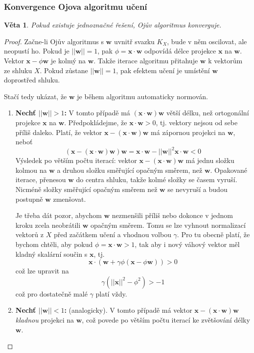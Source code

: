 \documentclass[11pt]{report} %
\renewcommand{\vec}[1]{\mathbf{#1}}
\newtheorem{theorem}{Věta}[section]
\numberwithin{equation}{section}
\begin{document}
\subsubsection{Konvergence Ojova algoritmu učení}
\begin{theorem}
Pokud existuje jednoznačné řešení, Ojův algoritmus konverguje.
\end{theorem}
\begin{proof}
Začne-li Ojův algoritmus s $\vec{w}$ uvnitř svazku $K_X$, bude v něm oscilovat, ale neopustí ho. Pokud je $||\vec{w}|| = 1$, pak $\phi = \vec{x}\cdot\vec{w}$ odpovídá délce projekce $\vec{x}$ na $\vec{w}$. Vektor $\vec{x} - \phi\vec{w}$ je kolmý na $\vec{w}$. Takže iterace algoritmu přitahuje $\vec{w}$ k vektorům ze shluku $X$. Pokud zůstane $||\vec{w}|| = 1$, pak efektem učení je umístění $\vec{w}$ doprostřed shluku.




Stačí tedy ukázat, že $\vec{w}$ je během algoritmu automaticky normován. 
\begin{enumerate}
	\item \textbf{Nechť $||\vec{w}|| > 1$:} V tomto případě má $(\vec{x}\cdot\vec{w})\vec{w}$ větší délku, než ortogonální projekce $\vec{x}$ na $\vec{w}$. Předpokládejme, že $\vec{x}\cdot\vec{w} > 0$, tj. vektory nejsou od sebe příliš daleko. Platí, že vektor $\vec{x} - (\vec{x}\cdot\vec{w})\vec{w}$ má zápornou projekci na $\vec{w}$, neboť
	 $$(\vec{x} - (\vec{x}\cdot\vec{w})\vec{w})\vec{w} = \vec{x}\cdot\vec{w} - ||\vec{w}||^2 \vec{x}\cdot\vec{w} < 0$$
	 Výsledek po větším počtu iterací: vektor $\vec{x} - (\vec{x}\cdot\vec{w})\vec{w}$ má jednu složku kolmou na $\vec{w}$ a druhou složku směřující opačným směrem, než $\vec{w}$. Opakované iterace, přenesou $\vec{w}$ do centra shluku, takže kolmé složky se časem vyruší. Nicméně složky směřující opačným směrem než $\vec{w}$ se nevyruší a budou postupně $\vec{w}$ zmenšovat.
	 
	 Je třeba dát pozor, abychom $\vec{w}$ nezmenšili příliš nebo dokonce v jednom kroku zcela neobrátili $\vec{w}$ opačným směrem. Tomu se lze vyhnout normalizací vektorů z $X$ před začátkem učení a vhodnou volbou $\gamma$. Pro tu obecně platí, že bychom chtěli, aby pokud $\phi = \vec{x}\cdot\vec{w} > 1$, tak aby i nový váhový vektor měl kladný skalární součin s $\vec{x}$, tj.
		$$\vec{x}\cdot(\vec{w} + \gamma\phi(\vec{x} - \phi\vec{w})) > 0$$
	což lze upravit na 
		$$\gamma(||\vec{x}||^2 - \phi^2) > -1$$
	což pro dostatečně malé $\gamma$ platí vždy.
	 
	\item \textbf{Nechť $||\vec{w}|| < 1$:} (analogicky). V tomto případě má vektor $\vec{x} - (\vec{x}\cdot\vec{w})\vec{w}$ \textit{kladnou} projekci na $\vec{w}$, což povede po větším počtu iterací ke zvětšování délky $\vec{w}$. 
\end{enumerate}


\end{proof}
\end{document}
